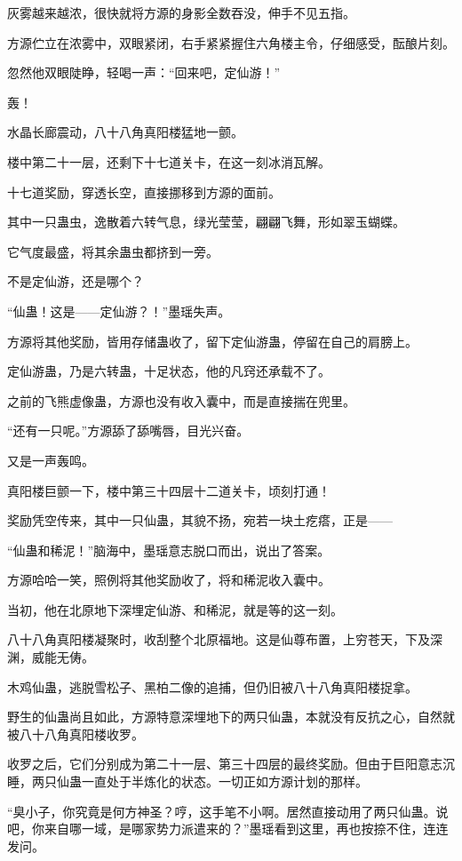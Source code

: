 \begin{this_body}
灰雾越来越浓，很快就将方源的身影全数吞没，伸手不见五指。

方源伫立在浓雾中，双眼紧闭，右手紧紧握住六角楼主令，仔细感受，酝酿片刻。

忽然他双眼陡睁，轻喝一声：“回来吧，定仙游！”

轰！

水晶长廊震动，八十八角真阳楼猛地一颤。

楼中第二十一层，还剩下十七道关卡，在这一刻冰消瓦解。

十七道奖励，穿透长空，直接挪移到方源的面前。

其中一只蛊虫，逸散着六转气息，绿光莹莹，翩翩飞舞，形如翠玉蝴蝶。

它气度最盛，将其余蛊虫都挤到一旁。

不是定仙游，还是哪个？

“仙蛊！这是——定仙游？！”墨瑶失声。

方源将其他奖励，皆用存储蛊收了，留下定仙游蛊，停留在自己的肩膀上。

定仙游蛊，乃是六转蛊，十足状态，他的凡窍还承载不了。

之前的飞熊虚像蛊，方源也没有收入囊中，而是直接揣在兜里。

“还有一只呢。”方源舔了舔嘴唇，目光兴奋。

又是一声轰鸣。

真阳楼巨颤一下，楼中第三十四层十二道关卡，顷刻打通！

奖励凭空传来，其中一只仙蛊，其貌不扬，宛若一块土疙瘩，正是——

“仙蛊和稀泥！”脑海中，墨瑶意志脱口而出，说出了答案。

方源哈哈一笑，照例将其他奖励收了，将和稀泥收入囊中。

当初，他在北原地下深埋定仙游、和稀泥，就是等的这一刻。

八十八角真阳楼凝聚时，收刮整个北原福地。这是仙尊布置，上穷苍天，下及深渊，威能无俦。

木鸡仙蛊，逃脱雪松子、黑柏二像的追捕，但仍旧被八十八角真阳楼捉拿。

野生的仙蛊尚且如此，方源特意深埋地下的两只仙蛊，本就没有反抗之心，自然就被八十八角真阳楼收罗。

收罗之后，它们分别成为第二十一层、第三十四层的最终奖励。但由于巨阳意志沉睡，两只仙蛊一直处于半炼化的状态。一切正如方源计划的那样。

“臭小子，你究竟是何方神圣？哼，这手笔不小啊。居然直接动用了两只仙蛊。说吧，你来自哪一域，是哪家势力派遣来的？”墨瑶看到这里，再也按捺不住，连连发问。

\end{this_body}


